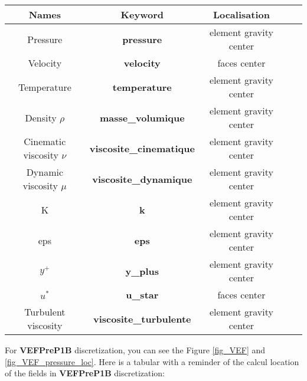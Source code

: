 \begin{longtable}[h!]{|c|c|c|c|c|}
\hline 
\textbf{Names}              & \textbf{Keyword}                  & \textbf{Localisation}     \\ \hline
\hline
Pressure                    & \textbf{pressure}                 & element gravity center    \\ \hline
Velocity                    & \textbf{velocity}                 & faces center              \\ \hline
Temperature                 & \textbf{temperature}              & element gravity center    \\ \hline
\hline
Density $\rho$              & \textbf{masse\_volumique}         & element gravity center    \\ \hline
Cinematic viscosity $\nu$   & \textbf{viscosite\_cinematique}   & element gravity center    \\ \hline
Dynamic viscosity $\mu$     & \textbf{viscosite\_dynamique}     & element gravity center    \\ \hline
\hline
K                           & \textbf{k}                        & element gravity center    \\ \hline
eps                         & \textbf{eps}                      & element gravity center    \\ \hline
$y^+$                       & \textbf{y\_plus}                  & element gravity center    \\ \hline
$u^*$                       & \textbf{u\_star}                  & faces center              \\ \hline
Turbulent viscosity         & \textbf{viscosite\_turbulente}    & element gravity center    \\ \hline
\end{longtable}


For \textbf{VEFPreP1B} discretization, you can see the Figure \ref{fig_VEF} and \ref{fig_VEF_pressure_loc}. Here is a tabular with a reminder of the calcul location of the fields in \textbf{VEFPreP1B} discretization:


